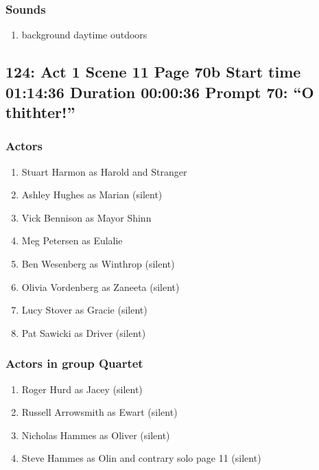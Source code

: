 \subsubsection{Sounds}
\begin{enumerate}
\item background daytime outdoors
\end{enumerate}
\subsection{124: Act 1 Scene 11 Page 70b Start time 01:14:36 Duration 00:00:36 Prompt 70: ``O thithter!''}

\subsubsection{Actors}
\begin{enumerate}
\item Stuart Harmon as Harold and Stranger
\item Ashley Hughes as Marian (silent)
\item Vick Bennison as Mayor Shinn
\item Meg Petersen as Eulalie
\item Ben Wesenberg as Winthrop (silent)
\item Olivia Vordenberg as Zaneeta (silent)
\item Lucy Stover as Gracie (silent)
\item Pat Sawicki as Driver (silent)
\end{enumerate}
\subsubsection{Actors in group Quartet}
\begin{enumerate}
\item Roger Hurd as Jacey (silent)
\item Russell Arrowsmith as Ewart (silent)
\item Nicholas Hammes as Oliver (silent)
\item Steve Hammes as Olin and contrary solo page 11 (silent)
\end{enumerate}
